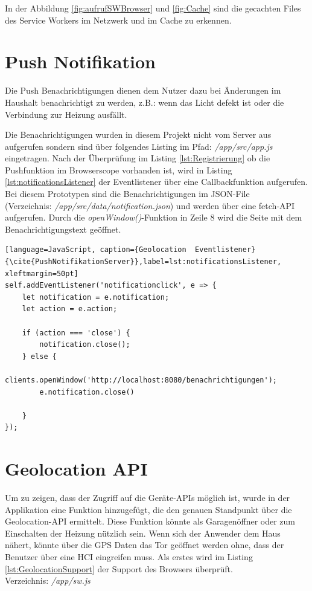 In der Abbildung \ref{fig:aufrufSWBrowser} und \ref{fig:Cache} sind die gecachten Files des Service Workers im Netzwerk und im Cache zu erkennen.



\clearpage
\section{Push Notifikation}
Die Push Benachrichtigungen dienen dem Nutzer dazu bei Änderungen im Haushalt benachrichtigt zu werden, z.B.: wenn das Licht defekt ist oder die Verbindung zur Heizung ausfällt.

Die Benachrichtigungen wurden in diesem Projekt nicht vom Server aus aufgerufen sondern sind über folgendes Listing im Pfad: \textit{/app/src/app.js} eingetragen. 
Nach der Überprüfung im Listing \ref{lst:Registrierung} ob die Pushfunktion im Browserscope vorhanden ist, wird in Listing \ref{lst:notificationsListener} der  Eventlistener über eine Callbackfunktion aufgerufen. Bei diesem Prototypen sind die Benachrichtigungen im JSON-File\\ (Verzeichnis: \textit{/app/src/data/notification.json}) und werden über eine fetch-API aufgerufen. Durch die \textit{openWindow()}-Funktion in Zeile 8 wird die Seite mit dem Benachrichtigungstext geöffnet.  
\\
\begin{lstlisting}[language=JavaScript, caption={Geolocation  Eventlistener} {\cite{PushNotifikationServer}},label=lst:notificationsListener, xleftmargin=50pt]
self.addEventListener('notificationclick', e => {
    let notification = e.notification;
    let action = e.action;

    if (action === 'close') {
        notification.close();
    } else {
        clients.openWindow('http://localhost:8080/benachrichtigungen');
        e.notification.close()

    }
});
\end{lstlisting}
\clearpage

\section{Geolocation API}
Um zu zeigen, dass der Zugriff auf die Geräte-APIs möglich ist, wurde in der Applikation eine Funktion hinzugefügt, die den genauen Standpunkt über die Geolocation-API ermittelt. Diese Funktion könnte als Garagenöffner oder zum Einschalten der Heizung nützlich sein. Wenn sich der Anwender dem Haus nähert, könnte über die GPS Daten das Tor geöffnet werden ohne, dass der Benutzer über eine HCI eingreifen muss. 
Als erstes wird im Listing \ref{lst:GeolocationSupport} der Support des Browsers überprüft.\\
Verzeichnis: \textit{/app/sw.js}

